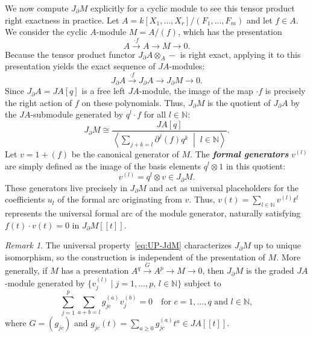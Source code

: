 \documentclass[a4paper, 12pt]{amsart}
\newcommand{\defterm}[1]{\textbf{\textit{#1}}\index{#1}}
\theoremstyle{definition}
\theoremstyle{remark}
\newtheorem{remark}[theorem]{Remark}
\begin{document}
We now compute $J_\partial M$ explicitly for a cyclic module to see this tensor product right exactness in practice.
Let $A = k[X_1, \dots, X_r]/(F_1, \dots, F_m)$ and let $f \in A$.
We consider the cyclic $A$-module $M = A/(f)$,
which has the presentation
\begin{equation*}
  A \xrightarrow{\cdot f} A \to M \to 0.
\end{equation*}
Because the tensor product functor $J_\partial A \otimes_A -$ is right exact, applying it to this presentation yields the exact sequence of $JA$-modules:
\begin{equation*}
  J_\partial A \xrightarrow{\cdot f} J_\partial A \to J_\partial M \to 0.
\end{equation*}
Since $J_\partial A = JA[q]$ is a free left $JA$-module, the image of the map $\cdot f$ is precisely the right action of $f$ on these polynomials. 
Thus, $J_\partial M$ is the quotient of $J_\partial A$ by the $JA$-submodule generated by $q^l \cdot f$ for all $l \in \mathbb{N}$:
\begin{equation}
  \label{eq:leibniz-coeff}
  J_\partial M \cong \frac{JA[q]}{\left\langle \sum_{j + k = l} \partial^j(f) q^k \;\middle|\; l \in \mathbb{N} \right\rangle}.
\end{equation}
Let $v = 1 + (f)$ be the canonical generator of $M$. 
The \defterm{formal generators} $v^{(l)}$ are simply defined as the image of the basis elements $q^l \otimes 1$ in this quotient:
\begin{equation*}
  v^{(l)} = q^l \otimes v \in J_\partial M.
\end{equation*}
These generators live precisely in $J_\partial M$ and act as universal placeholders for the coefficients $u_l$ of the formal arc originating from $v$.
Thus, $v(t) = \sum_{l \in \mathbb{N}} v^{(l)} t^l$ represents the universal formal arc of the module generator, naturally satisfying $f(t) \cdot v(t) = 0$ in $J_\partial M[[t]]$.


\begin{remark}
  \label{rmk:presentation-independence}
  The universal property~\eqref{eq:UP-JdM} characterizes $J_\partial M$ up to unique isomorphism,
  so the construction is independent of the presentation of $M$.
  More generally, if $M$ has a presentation $A^q \xrightarrow{G} A^p \to M \to 0$,
  then $J_\partial M$ is the graded $JA$-module generated by
  $\{v_j^{(l)} \mid j = 1, \dots, p, \, l \in \mathbb{N}\}$ subject to
  \begin{equation*}
    \sum_{j = 1}^{p} \sum_{a + b = l} g_{jc}^{(a)} v_j^{(b)} = 0 \quad \text{for $c = 1, \dots, q$ and $l \in \mathbb{N}$},
  \end{equation*}
  where $G = (g_{jc})$ and $g_{jc}(t) = \sum_{a \ge 0} g_{jc}^{(a)} t^a \in JA[[t]]$.
\end{remark}
\end{document}
